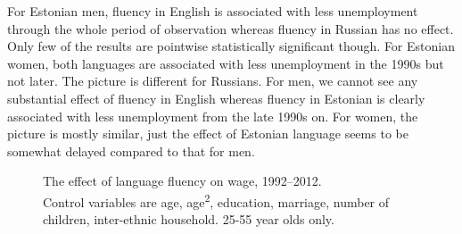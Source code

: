 \documentclass[12pt, a4paper]{article}
\newcommand{\modelTwo}{age, age\textsuperscript{2}, education, marriage, number of children, inter-ethnic household}
\newcommand{\agerestrictions}{25-55 year olds only.}
\begin{document}
For Estonian men, fluency in English is associated with less unemployment through the whole
period of observation whereas fluency in Russian has no effect.
Only few of the results are pointwise statistically significant though.
For Estonian women, both languages are associated with less
unemployment in the 1990s but not later. The picture is different for
Russians. For men, we cannot see any substantial effect of fluency in English
whereas fluency in Estonian is clearly associated with less unemployment from
the late 1990s on. For women, the picture is mostly similar, just the
effect of Estonian language seems to be somewhat delayed compared to
that for men.

\begin{figure}[tb!]
	\centering
	\caption{The effect of language fluency on wage, 1992--2012. \\ Control variables are \modelTwo. \agerestrictions}
	\label{fig:long-run_wage}
\end{figure}
\end{document}
